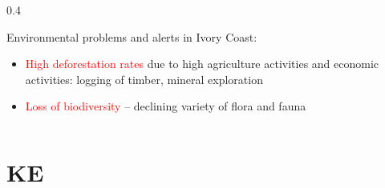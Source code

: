 \documentclass[pdflatex,compress,8pt,
	xcolor={dvipsnames,dvipsnames,svgnames,x11names,table},
	hyperref={colorlinks = true, breaklinks = true, urlcolor = NavyBlue, linkcolor=white, breaklinks = true}]{beamer}
\begin{document}
\begin{frame}
\begin{minipage}[0.4\textheight]{\textwidth}
\begin{columns}[T]
\begin{column}{0.4\textwidth}
\begin{alertblock}{Environmental problems and alerts in Ivory Coast:}
\begin{itemize}\small
      \item \textcolor{red}{High deforestation rates} due to high agriculture activities and economic activities: logging of timber, mineral exploration
      \item \textcolor{red}{Loss of biodiversity} -- declining variety of flora and fauna
 \end{itemize}
\end{alertblock}
\end{column}
\end{columns}
\end{minipage}
\end{frame}

\section{KE}
\end{document}
